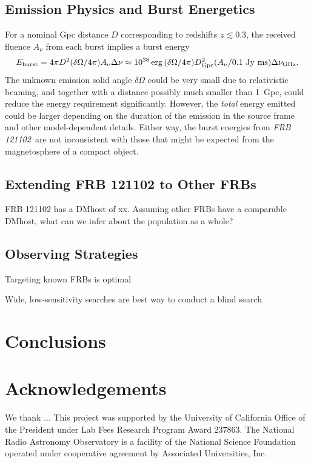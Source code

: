 \documentclass{emulateapj}
\newcommand{\frb}{\emph{FRB 121102}}
\begin{document}
\subsection{Emission Physics and Burst Energetics}

For a nominal Gpc distance $D$ corresponding to redshifts $z\lesssim 0.3$, the received fluence $A_{\nu}$ from each burst implies  a burst energy
$$E_{\rm burst} = 4\pi D^2 (\delta\Omega/4\pi) A_{\nu} \Delta\nu
\approx 10^{38}\, {\rm erg}\,(\delta\Omega/4\pi) D_{\rm Gpc}^2  (A_{\nu} / 0.1\ {\rm Jy\ ms}) \Delta\nu_{\rm GHz}.$$
The unknown  emission solid angle $\delta\Omega$
could be very small due to relativistic beaming, and together with a distance possibly much smaller than 1~Gpc, could reduce the energy requirement significantly.  However, the {\it total} energy emitted could be larger depending on the duration of the emission in the source frame and other model-dependent details.
Either way, the burst energies from \frb\ are not inconsistent with those that might be expected from the magnetosphere of a compact object\cite{cw16}.

\subsection{Extending FRB 121102 to Other FRBs}

FRB 121102 has a DMhost of xx. Assuming other FRBs have a comparable DMhost, what can we infer about the population as a whole?


\subsection{Observing Strategies}

Targeting known FRBs is optimal

Wide, low-sensitivity searches are best way to conduct a blind search

\section{Conclusions}





\section*{Acknowledgements}
We thank ...
This project was supported by the University of California Office of the President under Lab Fees Research Program Award 237863. The National Radio Astronomy Observatory is a facility of the National Science Foundation operated under cooperative agreement by Associated Universities, Inc. 
\end{document}
